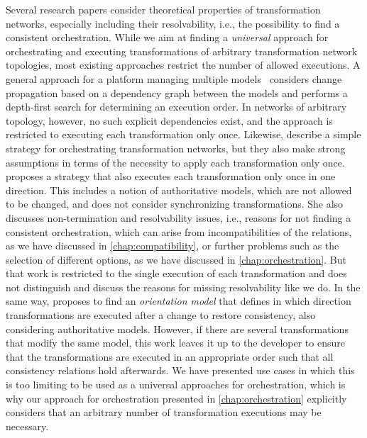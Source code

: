 Several research papers consider theoretical properties of transformation networks, especially including their resolvability, i.e., the possibility to find a consistent orchestration.
While we aim at finding a \emph{universal} approach for orchestrating and executing transformations of arbitrary transformation network topologies, most existing approaches restrict the number of allowed executions.
A general approach for a platform managing multiple models~\cite{denton2008naomi-Models} considers change propagation based on a dependency graph between the models and performs a depth-first search for determining an execution order.
In networks of arbitrary topology, however, no such explicit dependencies exist, and the approach is restricted to executing each transformation only once.
Likewise, \textcite{dirocco2017ConsistencyRecoveryInteractive-MODELS} describe a simple strategy for orchestrating transformation networks, but they also make strong assumptions in terms of the necessity to apply each transformation only once.
\textcite{stevens2020BidirectionalTransformationLarge-SoSym} proposes a strategy that also executes each transformation only once in one direction. This includes a notion of authoritative models, which are not allowed to be changed, and does not consider synchronizing transformations.
She also discusses non-termination and resolvability issues, i.e., reasons for not finding a consistent orchestration, which can arise from incompatibilities of the relations, as we have discussed in \autoref{chap:compatibility}, or further problems such as the selection of different options, as we have discussed in \autoref{chap:orchestration}.
But that work is restricted to the single execution of each transformation and does not distinguish and discuss the reasons for missing resolvability like we do.
In the same way, \textcite{stevens2020BuildingFromMegamodels-SoSym} proposes to find an \emph{orientation model} that defines in which direction transformations are executed after a change to restore consistency, also considering authoritative models.
However, if there are several transformations that modify the same model, this work leaves it up to the developer to ensure that the transformations are executed in an appropriate order such that all consistency relations hold afterwards.
We have presented use cases in which this is too limiting to be used as a universal approaches for orchestration, which is why our approach for orchestration presented in \autoref{chap:orchestration} explicitly considers that an arbitrary number of transformation executions may be necessary.

